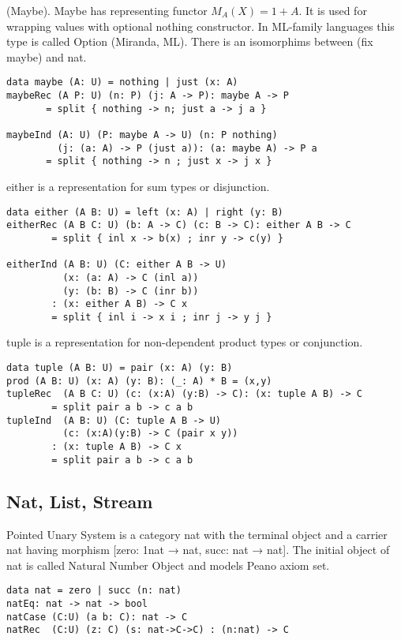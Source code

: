 \begin{definition} (Maybe).
Maybe has representing functor $M_A(X) = 1 + A$.
It is used for wrapping values with optional nothing constructor.
In ML-family languages this type is called Option (Miranda, ML).
There is an isomorphims between (fix maybe) and nat.
\begin{lstlisting}
data maybe (A: U) = nothing | just (x: A)
maybeRec (A P: U) (n: P) (j: A -> P): maybe A -> P
       = split { nothing -> n; just a -> j a }

maybeInd (A: U) (P: maybe A -> U) (n: P nothing)
         (j: (a: A) -> P (just a)): (a: maybe A) -> P a
       = split { nothing -> n ; just x -> j x }
\end{lstlisting}
\end{definition}

either is a representation for sum types or disjunction.
\begin{lstlisting}
data either (A B: U) = left (x: A) | right (y: B)
eitherRec (A B C: U) (b: A -> C) (c: B -> C): either A B -> C
        = split { inl x -> b(x) ; inr y -> c(y) }

eitherInd (A B: U) (C: either A B -> U)
          (x: (a: A) -> C (inl a))
          (y: (b: B) -> C (inr b))
        : (x: either A B) -> C x
        = split { inl i -> x i ; inr j -> y j }
\end{lstlisting}

tuple is a representation for non-dependent product types or conjunction.
\begin{lstlisting}
data tuple (A B: U) = pair (x: A) (y: B)
prod (A B: U) (x: A) (y: B): (_: A) * B = (x,y)
tupleRec  (A B C: U) (c: (x:A) (y:B) -> C): (x: tuple A B) -> C
        = split pair a b -> c a b
tupleInd  (A B: U) (C: tuple A B -> U)
          (c: (x:A)(y:B) -> C (pair x y))
        : (x: tuple A B) -> C x
        = split pair a b -> c a b
\end{lstlisting}

\subsection{Nat, List, Stream}
Pointed Unary System is a category nat with the terminal
object and a carrier nat having morphism [zero: 1nat → nat, succ: nat → nat].
The initial object of nat is called Natural Number Object and models Peano axiom set.

\begin{lstlisting}
data nat = zero | succ (n: nat)
natEq: nat -> nat -> bool
natCase (C:U) (a b: C): nat -> C
natRec  (C:U) (z: C) (s: nat->C->C) : (n:nat) -> C
\end{lstlisting}

